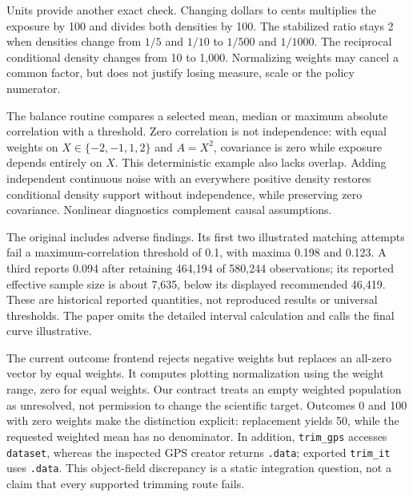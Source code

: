 Units provide another exact check. Changing dollars to cents multiplies the
exposure by 100 and divides both densities by 100. The stabilized ratio stays
2 when densities change from $1/5$ and $1/10$ to $1/500$ and $1/1000$.
The reciprocal conditional density changes from 10 to 1,000. Normalizing weights
may cancel a common factor, but does not justify losing measure, scale or the
policy numerator.~\citep{exec24_dose_contract}

The balance routine compares a selected mean, median or maximum absolute
correlation with a threshold. Zero correlation is not independence: with equal
weights on $X\in\{-2,-1,1,2\}$ and $A=X^2$, covariance is zero while exposure
depends entirely on $X$. This deterministic example also lacks overlap.
Adding independent continuous noise with an everywhere positive density
restores conditional density support without independence, while preserving
zero covariance. Nonlinear diagnostics complement causal assumptions.
\citep{exec24_dose_causalgps,exec24_dose_contract}

The original includes adverse findings. Its first two illustrated matching
attempts fail a maximum-correlation threshold of 0.1, with maxima 0.198 and
0.123. A third reports 0.094 after retaining 464,194 of 580,244 observations;
its reported effective sample size is about 7,635, below its displayed
recommended 46,419. These are historical reported quantities, not reproduced
results or universal thresholds. The paper omits the detailed interval
calculation and calls the final curve illustrative.
\citep{exec24_dose_original}

The current outcome frontend rejects negative weights but replaces an all-zero
vector by equal weights. It computes plotting normalization using the weight
range, zero for equal weights. Our contract treats an empty weighted population
as unresolved, not permission to change the scientific target. Outcomes 0 and
100 with zero weights make the distinction explicit: replacement yields 50,
while the requested weighted mean has no denominator. In addition,
\texttt{trim\_gps} accesses \texttt{dataset}, whereas the inspected GPS creator
returns \texttt{.data}; exported \texttt{trim\_it} uses \texttt{.data}.
This object-field discrepancy is a static integration question, not a claim
that every supported trimming route fails.
\citep{exec24_dose_causalgps,exec24_dose_contract}

